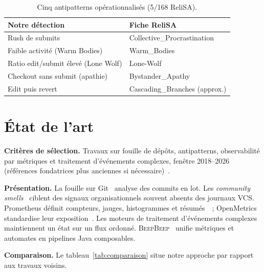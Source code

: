 \documentclass[conference]{IEEEtran}
\newcommand{\beepbeep}{\textsc{BeepBeep}}
\begin{document}
\begin{table}[!t]
  \caption{Cinq antipatterns opérationnalisés (5/168 ReliSA).}
  \label{tab:relisas}
  \centering
  \small
  \begin{tabular}{ll}
    \toprule
    \textbf{Notre détection} & \textbf{Fiche ReliSA} \\
    \midrule
    Rush de submits & Collective\_Procrastination \\
    Faible activité (Warm Bodies) & Warm\_Bodies \\
    Ratio edit/submit élevé (Lone Wolf) & Lone-Wolf \\
    Checkout sans submit (apathie) & Bystander\_Apathy \\
    Edit puis revert & Cascading\_Branches (approx.) \\
    \bottomrule
  \end{tabular}
\end{table}

\section{\'Etat de l'art}
\label{sec:etat}

\textbf{Critères de sélection.}
Travaux sur fouille de dépôts, antipatterns, observabilité par métriques
et traitement d'événements complexes, fenêtre 2018--2026 (références
fondatrices plus anciennes si
nécessaire)~\cite{luckham2002power,brown1998antipatterns}.

\textbf{Présentation.}
La fouille sur Git~\cite{hindle2008mining} analyse des commits en lot.
Les \emph{community smells}~\cite{tamburri2019community} ciblent des
signaux organisationnels souvent absents des journaux VCS. Prometheus
définit compteurs, jauges, histogrammes et
résumés~\cite{brazil2018prometheus,prometheus_metric_types}~;
OpenMetrics standardise leur
exposition~\cite{openmetrics}. Les moteurs de traitement d'événements
complexes~\cite{luckham2002power} maintiennent un état sur un flux
ordonné. \beepbeep{}~\cite{halle2018beepbeep} unifie métriques et
automates en pipelines Java composables.

\textbf{Comparaison.}
Le tableau~\ref{tab:comparaison} situe notre approche par rapport aux
travaux voisins.
\end{document}
